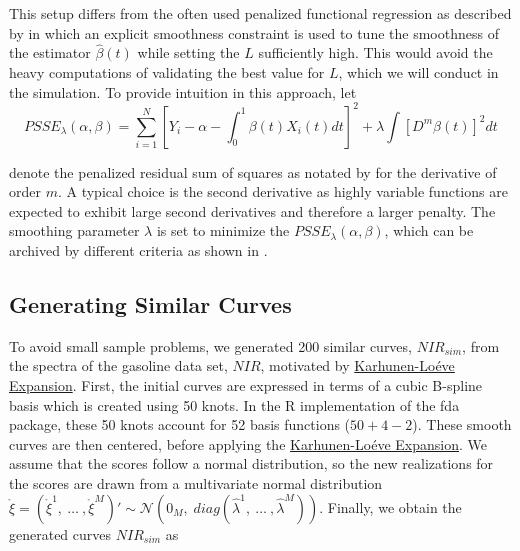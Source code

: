 \documentclass[11pt,twoside,a4paper]{article}
\begin{document}
	This setup differs from the often used penalized functional regression as described by \cite{Goldsmith_2011} in which an explicit smoothness constraint is used to tune the smoothness of the estimator $\hat{\beta}(t)$ while setting the $L$ sufficiently high. This would avoid the heavy computations of validating the best value for $L$, which we will conduct in the simulation. To provide intuition in this approach, let 
	 \begin{equation}
	 	PSSE_\lambda(\alpha, \beta) = \sum_{i = 1}^{N} \left[ Y_i -\alpha -\int_0^1 \beta(t)X_i(t)dt \right]^2 + \lambda \int \left[D^m\beta(t)\right]^2 dt
	 \end{equation}
 
	 denote the penalized residual sum of squares as notated by \cite{ramsay_functional_2005} for the derivative of order $m$. A typical choice is the second derivative as highly variable functions are expected to exhibit large second derivatives and therefore a larger penalty. The smoothing parameter $\lambda$ is set to minimize the $PSSE_\lambda(\alpha, \beta)$, which can be archived by different criteria as shown in \cite{ThomasLee_2003}.
		
		
	
	\subsection{Generating Similar Curves}\label{similar_curves}
	To avoid small sample problems, we generated 200 similar curves, $NIR_{sim}$, from the spectra of the gasoline data set, $NIR$, motivated by \hyperlink{KL}{Karhunen-Lo\'{e}ve Expansion}. First, the initial curves are expressed in terms of a  cubic B-spline basis which is created using 50 knots. In the R implementation of the fda package, these 50 knots account for 52 basis functions ($50+4-2$). These smooth curves are then centered, before applying the \hyperlink{KL}{Karhunen-Lo\'{e}ve Expansion}. We assume that the scores follow a normal distribution, so the new realizations for the scores are drawn from a multivariate normal distribution $\mathring{\xi} = \left(\mathring{\xi}^{1},\: \dots \:, \mathring{\xi}^{M}\right)' \sim \mathcal{N}(0_M, \; diag(\hat{\lambda}^1,\: \dots\:, \hat{\lambda}^M))$. Finally, we obtain the generated curves $NIR_{sim}$ as
	
\end{document}
